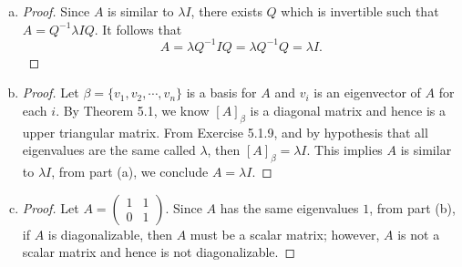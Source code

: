 \begin{Exercise}
\begin{enumerate}[(a)]
\item
\begin{proof}
Since $A$ is similar to $\lambda I$, there exists $Q$ which is invertible such that $A = Q^{-1} \lambda I Q$. It follows that
$$
A = \lambda Q^{-1} I Q = \lambda Q^{-1} Q = \lambda I.
$$
\end{proof}

\item
\begin{proof}
Let $\beta = \{v_1,v_2,\cdots,v_n\}$ is a basis for $A$ and $v_i$ is an eigenvector of $A$ for each $i$. By Theorem 5.1, we know $[A]_{\beta}$ is a diagonal matrix and hence is a upper triangular matrix. From Exercise 5.1.9, and by hypothesis that all eigenvalues are the same called $\lambda$, then $[A]_{\beta} = \lambda I$. This implies $A$ is similar to $\lambda I$, from part (a), we conclude $A = \lambda I$.
\end{proof}

\item
\begin{proof}
Let $A = \begin{pmatrix}
1 & 1 \\
0 & 1
\end{pmatrix}$. Since $A$ has the same eigenvalues $1$, from part (b), if $A$ is diagonalizable, then $A$ must be a scalar matrix; however, $A$ is not a scalar matrix and hence is not diagonalizable. 
\end{proof}
\end{enumerate}
\end{Exercise}
